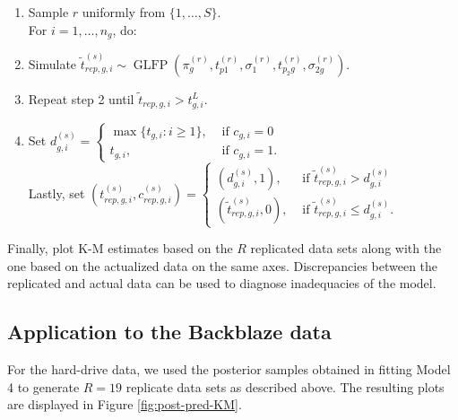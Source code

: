 \documentclass[12pt]{article}
\newcommand{\op}{\operatorname}
\begin{document}
\begin{enumerate}
\item Sample $r$ uniformly from $\{1,\ldots,S\}$.\\ For $i=1,\ldots,n_g$, do:
\item Simulate $\tilde{t}_{rep,g,i}^{(s)} \sim \op{GLFP}(\pi_{g}^{(r)},t_{p1}^{(r)},\sigma_1^{(r)},t_{p_{2}g}^{(r)}, \sigma_{2g}^{(r)})$.
\item Repeat step 2 until $\tilde{t}_{rep,g,i} > t_{g,i}^L$.
\item Set $d_{g,i}^{(s)}= \begin{cases} \max \{t_{g,i}: i \ge 1\}, & \mbox{ if }c_{g,i}=0\\
t_{g,i}, & \mbox{ if }c_{g, i}=1. \end{cases}$\\
Lastly, set $(t_{rep,g,i}^{(s)},c_{rep,g,i}^{(s)}) = \begin{cases}
  (d_{g,i}^{(s)},1), & \mbox{ if } \tilde{t}_{rep,g,i}^{(s)}>d_{g,i}^{(s)}\\
  (\tilde{t}_{rep,g,i}^{(s)},0), & \mbox{ if }\tilde{t}_{rep,g,i}^{(s)} \le d_{g,i}^{(s)}.
\end{cases}$
\end{enumerate}
Finally, plot K-M estimates based on the $R$ replicated data sets along with the one based on the actualized data on the same axes. Discrepancies between the replicated and actual data can be used to diagnose inadequacies of the model.

\subsection{Application to the Backblaze data}
For the hard-drive data, we used the posterior samples obtained in fitting Model 4 to generate $R=19$ replicate data sets as described above. The resulting plots are displayed in Figure \ref{fig:post-pred-KM}. 


\end{document}
